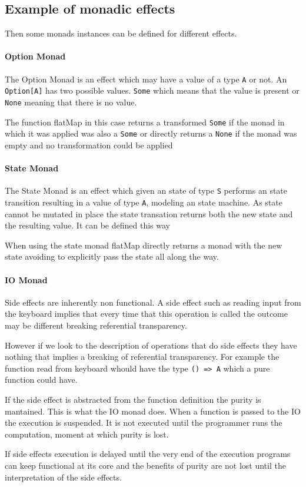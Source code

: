 \subsection{Example of monadic effects}
Then some monads instances can be defined for different effects.

\paragraph{Option Monad}
The Option Monad is an effect which may have a value of a type \texttt{A} or
not. An \texttt{Option[A]} has two possible values. \texttt{Some} which means
that the value is present or \texttt{None} meaning that there is no value.

The function flatMap in this case returns a transformed \texttt{Some} if the monad in which
it was applied was also a \texttt{Some} or directly returns a \texttt{None} if
the monad was empty and no transformation could be applied

\paragraph{State Monad}
The State Monad is an effect which given an state of type \texttt{S} performs an state
transition resulting in a value of type \texttt{A}, modeling an state machine.
As state cannot be mutated in place the state transation returns both the new
state and the resulting value. It can be defined this way

When using the state monad flatMap directly returns a monad with the new state
avoiding to explicitly pass the state all along the way.

\paragraph{IO Monad}
Side effects are inherently non functional. A side effect such as reading input
from the keyboard implies that every time that this operation is called the
outcome may be different breaking referential transparency.

However if we look to the description of operations that do side effects they
have nothing that implies a breaking of referential transparency. For example
the function read from keyboard whould have the type \texttt{() => A} which a
pure function could have.

If the side effect is abstracted from the function definition the purity is
mantained. This is what the IO monad does. When a function is passed to the IO
the execution is suspended. It is not executed until the programmer runs the
computation, moment at which purity is lost.

If side effects execution is delayed until the very end of the execution programs
can keep functional at its core and the benefits of purity are not lost until
the interpretation of the side effects.
